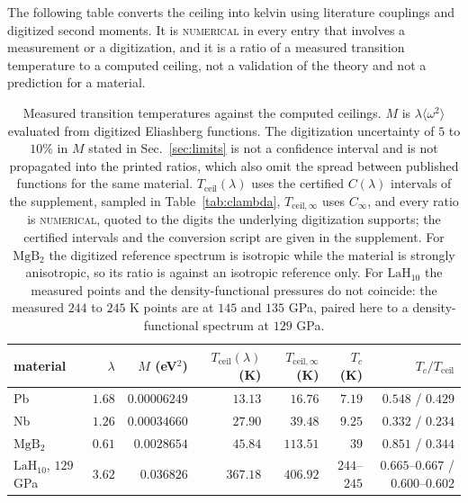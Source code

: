 \documentclass[aps,10pt,superscriptaddress,floatfix,amsmath,amssymb,nofootinbib]{revtex4-2}
\newcommand{\Cinf}{C_\infty}
\newcommand{\NUM}{\textsc{numerical}}
\begin{document}
The following table converts the ceiling into kelvin using literature couplings and
digitized second moments. It is \NUM{} in every entry that involves a measurement or a
digitization, and it is a ratio of a measured transition temperature to a computed
ceiling, not a validation of the theory and not a prediction for a material.

\begin{table}[h]
\caption{Measured transition temperatures against the computed ceilings. $M$ is
$\lambda\langle\omega^{2}\rangle$ evaluated from digitized Eliashberg functions. The
digitization uncertainty of $5$ to $10\%$ in $M$ stated in Sec.~\ref{sec:limits} is not a
confidence interval and is not propagated into the printed ratios, which also omit the
spread between published functions for the same material.
$T_{\mathrm{ceil}}(\lambda)$ uses the certified $C(\lambda)$ intervals of the supplement,
sampled in Table~\ref{tab:clambda},
$T_{\mathrm{ceil},\infty}$ uses $\Cinf$, and every ratio is \NUM{}, quoted to the digits
the underlying digitization supports; the certified intervals and the conversion script
are given in the supplement. For $\mathrm{MgB_{2}}$ the digitized reference spectrum is
isotropic while the material is strongly anisotropic, so its ratio is against an isotropic
reference only. For $\mathrm{LaH_{10}}$ the measured points and the density-functional
pressures do not coincide: the measured $244$ to $245$ K points are at $145$ and $135$ GPa,
paired here to a density-functional spectrum at $129$ GPa.\label{tab:mat}}
\small
\begin{tabular}{@{}lrrrrrr@{}}
\hline
material & $\lambda$ & $M$ (eV$^{2}$) & $T_{\mathrm{ceil}}(\lambda)$ (K) & $T_{\mathrm{ceil},\infty}$ (K) & $T_c$ (K) & $T_c/T_{\mathrm{ceil}}$ \\
\hline
Pb & $1.68$ & $0.00006249$ & $13.13$ & $16.76$ & $7.19$ & $0.548$ / $0.429$ \\
Nb & $1.26$ & $0.00034660$ & $27.90$ & $39.48$ & $9.25$ & $0.332$ / $0.234$ \\
$\mathrm{MgB_{2}}$ & $0.61$ & $0.0028654$ & $45.84$ & $113.51$ & $39$ & $0.851$ / $0.344$ \\
$\mathrm{LaH_{10}}$, $129$ GPa & $3.62$ & $0.036826$ & $367.18$ & $406.92$ & $244$--$245$ & $0.665$--$0.667$ / $0.600$--$0.602$ \\
\hline
\end{tabular}
\end{table}
\end{document}
